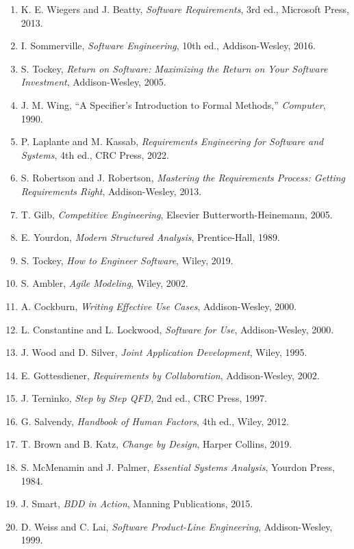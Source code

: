 \documentclass[a4paper,11pt]{ltjsarticle}
\numberwithin{figure}{section}
\numberwithin{table}{section}
\begin{document}
\footnotesize
\begin{enumerate}[leftmargin=2.2em,itemsep=.15ex]
\item K. E. Wiegers and J. Beatty, \textit{Software Requirements}, 3rd ed., Microsoft Press, 2013.
\item I. Sommerville, \textit{Software Engineering}, 10th ed., Addison-Wesley, 2016.
\item S. Tockey, \textit{Return on Software: Maximizing the Return on Your Software Investment}, Addison-Wesley, 2005.
\item J. M. Wing, ``A Specifier's Introduction to Formal Methods,'' \textit{Computer}, 1990.
\item P. Laplante and M. Kassab, \textit{Requirements Engineering for Software and Systems}, 4th ed., CRC Press, 2022.
\item S. Robertson and J. Robertson, \textit{Mastering the Requirements Process: Getting Requirements Right}, Addison-Wesley, 2013.
\item T. Gilb, \textit{Competitive Engineering}, Elsevier Butterworth-Heinemann, 2005.
\item E. Yourdon, \textit{Modern Structured Analysis}, Prentice-Hall, 1989.
\item S. Tockey, \textit{How to Engineer Software}, Wiley, 2019.
\item S. Ambler, \textit{Agile Modeling}, Wiley, 2002.
\item A. Cockburn, \textit{Writing Effective Use Cases}, Addison-Wesley, 2000.
\item L. Constantine and L. Lockwood, \textit{Software for Use}, Addison-Wesley, 2000.
\item J. Wood and D. Silver, \textit{Joint Application Development}, Wiley, 1995.
\item E. Gottesdiener, \textit{Requirements by Collaboration}, Addison-Wesley, 2002.
\item J. Terninko, \textit{Step by Step QFD}, 2nd ed., CRC Press, 1997.
\item G. Salvendy, \textit{Handbook of Human Factors}, 4th ed., Wiley, 2012.
\item T. Brown and B. Katz, \textit{Change by Design}, Harper Collins, 2019.
\item S. McMenamin and J. Palmer, \textit{Essential Systems Analysis}, Yourdon Press, 1984.
\item J. Smart, \textit{BDD in Action}, Manning Publications, 2015.
\item D. Weiss and C. Lai, \textit{Software Product-Line Engineering}, Addison-Wesley, 1999.

\end{enumerate}
\end{document}
